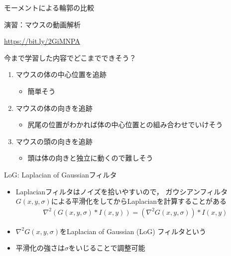 \documentclass[10pt]{beamer}
\begin{document}
	\begin{frame}{モーメントによる輪郭の比較}
	    
	\end{frame}
	
	\begin{frame}{演習：マウスの動画解析}
	    \begin{center}
	        \url{https://bit.ly/2GiMNPA}
	    \end{center}
	    今まで学習した内容でどこまでできそう？
	    \begin{enumerate}
	        \item マウスの体の中心位置を追跡
	            \begin{itemize}
	                \item 簡単そう
	            \end{itemize}
	        \item マウスの体の向きを追跡
	            \begin{itemize}
	                \item 尻尾の位置がわかれば体の中心位置との組み合わせでいけそう
	            \end{itemize}
	        \item マウスの頭の向きを追跡
	            \begin{itemize}
	                \item 頭は体の向きと独立に動くので難しそう
	            \end{itemize}
	    \end{enumerate}
	\end{frame}
	
		\begin{frame}{LoG: Laplacian of Gaussianフィルタ}
	    \begin{itemize}
	        \item Laplacianフィルタはノイズを拾いやすいので，
	            ガウシアンフィルタ$G(x,y,\sigma)$による平滑化をしてからLaplacianを計算することがある
	            \begin{align*}
	                \nabla^2(G(x,y,\sigma)\ast I(x,y)) = (\nabla^2G(x,y,\sigma)) \ast I(x,y)
	            \end{align*}
	        \item $\nabla^2G(x,y,\sigma)$をLaplacian of Gaussian (LoG) フィルタという
	        \item 平滑化の強さは$\sigma$をいじることで調整可能
	    \end{itemize}
	\end{frame}
	\fi
	
\end{document}
